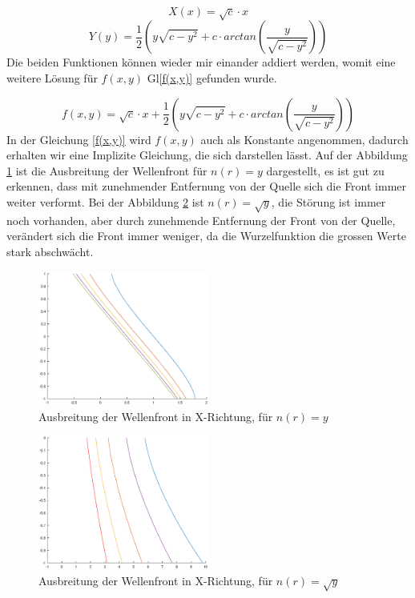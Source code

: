 \begin{refsection}
\begin{equation}\label{X}
X(x)=\sqrt{c}\cdot x
\end{equation}
\begin{equation}\label{Y}
Y(y)=\dfrac{1}{2}\left(y \sqrt{c-y^{2}}+c \cdot arctan\left(  \dfrac{y}{\sqrt{c-y^{2}}}\right) \right) 
\end{equation}
Die beiden Funktionen können wieder mir einander addiert werden, womit eine weitere Lösung für $f(x,y)$  Gl\eqref{f(x,y)} gefunden wurde.

\begin{equation}\label{f(x,y)}
f(x,y)= \sqrt{c}\cdot x + \dfrac{1}{2}\left(y \sqrt{c-y^{2}}+c \cdot arctan\left(  \dfrac{y}{\sqrt{c-y^{2}}}\right) \right) 
\end{equation}
In der Gleichung \eqref{f(x,y)} wird $f(x,y)$ auch als Konstante angenommen, dadurch erhalten wir eine Implizite Gleichung, die sich darstellen lässt. 
Auf der Abbildung \ref{fig:plotwf1} ist die Ausbreitung der Wellenfront für $n(r)=y$ dargestellt, es ist gut zu erkennen, dass mit zunehmender Entfernung von der Quelle sich die Front immer weiter verformt. Bei der Abbildung \ref{fig:plotwf2} ist $n(r)= \sqrt{y}$, die Störung ist immer noch vorhanden, aber durch zunehmende Entfernung der Front von der Quelle, verändert sich die Front immer weniger, da die Wurzelfunktion die grossen Werte stark abschwächt.
\begin{figure}
  \centering
  \includegraphics[width=0.5\textwidth]{adaptiv/images/plotwf1}
  \caption{Ausbreitung der Wellenfront in X-Richtung, für $n(r)=y$}
  \label{fig:plotwf1}
\end{figure}

\begin{figure}
  \centering
  \includegraphics[width=0.5\textwidth]{adaptiv/images/plotwf2}
  \caption{Ausbreitung der Wellenfront in X-Richtung, für $n(r)=\sqrt{y}$}
  \label{fig:plotwf2}
\end{figure}

\printbibliography[heading=subbibliography]
\end{refsection}















